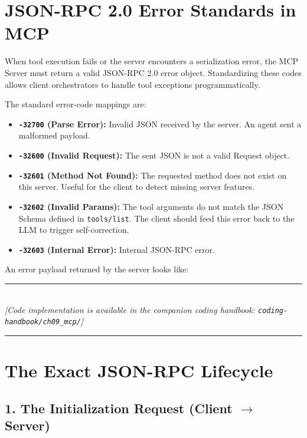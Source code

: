 \section{JSON-RPC 2.0 Error Standards in MCP}

When tool execution fails or the server encounters a serialization error, the MCP Server must return a valid JSON-RPC 2.0 error object. Standardizing these codes allows client orchestrators to handle tool exceptions programmatically.

The standard error-code mappings are:
\begin{itemize}
    \item \textbf{\texttt{-32700} (Parse Error):} Invalid JSON received by the server. An agent sent a malformed payload.
    \item \textbf{\texttt{-32600} (Invalid Request):} The sent JSON is not a valid Request object.
    \item \textbf{\texttt{-32601} (Method Not Found):} The requested method does not exist on this server. Useful for the client to detect missing server features.
    \item \textbf{\texttt{-32602} (Invalid Params):} The tool arguments do not match the JSON Schema defined in \texttt{tools/list}. The client should feed this error back to the LLM to trigger self-correction.
    \item \textbf{\texttt{-32603} (Internal Error):} Internal JSON-RPC error.
\end{itemize}

An error payload returned by the server looks like:

\begin{center}
\noindent\rule{0.6\textwidth}{0.4pt} \\
\vspace{0.3em}
\textit{[Code implementation is available in the companion coding handbook: \texttt{coding-handbook/ch09\_mcp/}]} \\
\noindent\rule{0.6\textwidth}{0.4pt}
\end{center}


\section{The Exact JSON-RPC Lifecycle}

\subsection{1. The Initialization Request (Client $\to$ Server)}

